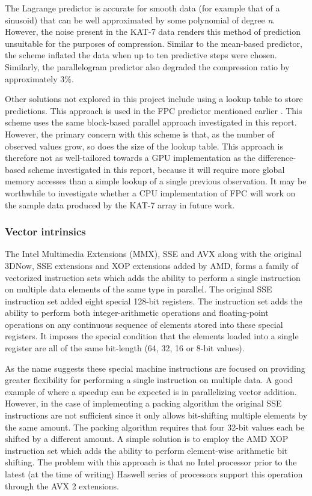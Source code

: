   The Lagrange predictor is accurate for smooth data (for example that of a sinusoid) that can be well approximated by some polynomial of degree \textit{n}. However, the noise present in the KAT-7 data renders this
  method of prediction unsuitable for the purposes of compression. Similar to the mean-based predictor, the scheme inflated the data when up to ten predictive steps were chosen. Similarly, the parallelogram predictor 
  also degraded the compression ratio by approximately 3\%.
  
  Other solutions not explored in this project include using a lookup table to store predictions. This approach is used in the FPC predictor mentioned earlier \cite{4589203,4976448}.
  This scheme uses the same block-based parallel approach investigated in this report. However, the primary concern with this 
  scheme is that, as the number of observed values grow, so does the size of the lookup table. This approach is therefore not as well-tailored towards a GPU implementation as the difference-based scheme investigated 
  in this report, because it will require more global memory accesses than a simple lookup of a single previous observation. It may be worthwhile to investigate whether a CPU implementation of FPC will work on the sample 
  data produced by the KAT-7 array in future work.
  \subsubsection{Vector intrinsics}
  The Intel Multimedia Extensions (MMX), SSE and AVX along with the original 3DNow, SSE extensions and XOP extensions added by AMD, forms a family of vectorized instruction sets which adds the ability to 
  perform a single instruction on multiple data elements of the same type in parallel. The original SSE instruction set added eight special 128-bit registers. The instruction set adds 
  the ability to perform both integer-arithmetic operations and floating-point operations on any continuous sequence of elements stored into these special registers. It imposes the special condition that the 
  elements loaded into a single register are all of the same bit-length (64, 32, 16 or 8-bit values).
  
  As the name suggests these special machine instructions are focused on providing greater flexibility for performing a single instruction on multiple data. A good example of where
  a speedup can be expected is in parallelizing vector addition. However, in the case of implementing a packing algorithm the original SSE instructions are not sufficient since it only allows 
  bit-shifting multiple elements by the same amount. The packing algorithm requires that four 32-bit values each be shifted by a different amount. A simple solution is to employ the AMD XOP 
  instruction set which adds the ability to perform element-wise arithmetic bit shifting. The problem with this approach is that no Intel processor prior to the latest (at the time of writing) 
  Haswell series of processors support this operation through the AVX 2 extensions.
  
